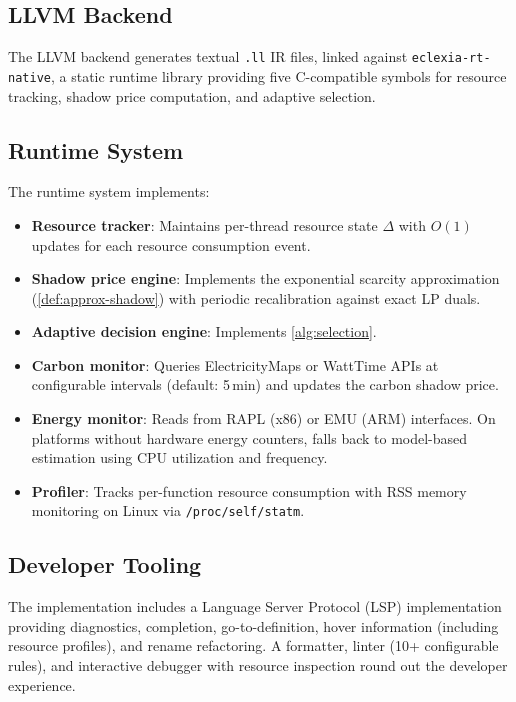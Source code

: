 \documentclass[11pt,a4paper]{article}
\begin{document}
\subsection{LLVM Backend}

The LLVM backend generates textual \texttt{.ll} IR files, linked against
\texttt{eclexia-rt-native}, a static runtime library providing five
C-compatible symbols for resource tracking, shadow price computation, and
adaptive selection.

\subsection{Runtime System}

The runtime system implements:

\begin{itemize}
  \item \textbf{Resource tracker}: Maintains per-thread resource state
    $\Delta$ with $O(1)$ updates for each resource consumption event.

  \item \textbf{Shadow price engine}: Implements the exponential scarcity
    approximation (\cref{def:approx-shadow}) with periodic recalibration
    against exact LP duals.

  \item \textbf{Adaptive decision engine}: Implements \cref{alg:selection}.

  \item \textbf{Carbon monitor}: Queries ElectricityMaps or WattTime APIs at
    configurable intervals (default: 5\,min) and updates the carbon shadow
    price.

  \item \textbf{Energy monitor}: Reads from RAPL (x86) or EMU (ARM)
    interfaces.  On platforms without hardware energy counters, falls back to
    model-based estimation using CPU utilization and frequency.

  \item \textbf{Profiler}: Tracks per-function resource consumption with RSS
    memory monitoring on Linux via \texttt{/proc/self/statm}.
\end{itemize}

\subsection{Developer Tooling}

The implementation includes a Language Server Protocol (LSP) implementation
providing diagnostics, completion, go-to-definition, hover information
(including resource profiles), and rename refactoring.  A formatter, linter
(10+ configurable rules), and interactive debugger with resource inspection
round out the developer experience.
\end{document}
